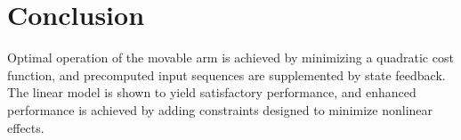 \section{Conclusion}\label{sec:conclusion}

Optimal operation of the movable arm is achieved by minimizing a quadratic cost function, and precomputed input sequences are supplemented by state feedback. The linear model is shown to yield satisfactory performance, and enhanced performance is achieved by adding constraints designed to minimize nonlinear effects. 